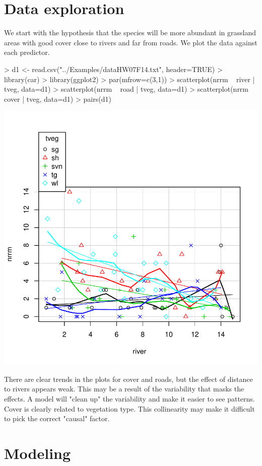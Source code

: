 \documentclass{article}
\begin{document}
\section{Data exploration}
We start with the hypothesis that the species will be more abundant in grassland areas with good cover close to rivers and far from roads. We plot the data against each predictor.

\begin{Schunk}
\begin{Sinput}
> d1 <- read.csv("../Examples/dataHW07F14.txt", header=TRUE)
> library(car)
> library(ggplot2)
> par(mfrow=c(3,1))
> scatterplot(nrrm ~ river | tveg, data=d1)
> scatterplot(nrrm ~ road | tveg, data=d1)
> scatterplot(nrrm ~ cover | tveg, data=d1)
> pairs(d1)
\end{Sinput}
\end{Schunk}
\includegraphics{HW07PLS206F14-explore}

There are clear trends in the plots for cover and roads, but the effect of distance to rivers appears weak. This may be a result of the variability that masks the effects. A model will "clean up" the variability and make it easier to see patterns. Cover is clearly related to vegetation type. This collinearity may make it difficult to pick the correct "causal" factor.


\section{Modeling}
\end{document}
